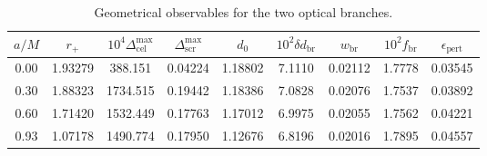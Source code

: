 \begin{table}[t]
\centering
\caption{Geometrical observables for the two optical branches.}
\begin{tabular}{ccccccccc}
\hline
$a/M$ & $r_+$ & $10^4\Delta_{\mathrm{cel}}^{\max}$ & $\Delta_{\mathrm{scr}}^{\max}$ & $d_0$ & $10^2\delta d_{\mathrm{br}}$ & $w_{\mathrm{br}}$ & $10^2 f_{\mathrm{br}}$ & $\epsilon_{\mathrm{pert}}$ \\
\hline
0.00 & 1.93279 & 388.151 & 0.04224 & 1.18802 & 7.1110 & 0.02112 & 1.7778 & 0.03545 \\
0.30 & 1.88323 & 1734.515 & 0.19442 & 1.18386 & 7.0828 & 0.02076 & 1.7537 & 0.03892 \\
0.60 & 1.71420 & 1532.449 & 0.17763 & 1.17012 & 6.9975 & 0.02055 & 1.7562 & 0.04221 \\
0.93 & 1.07178 & 1490.774 & 0.17950 & 1.12676 & 6.8196 & 0.02016 & 1.7895 & 0.04557 \\
\hline
\end{tabular}
\end{table}
